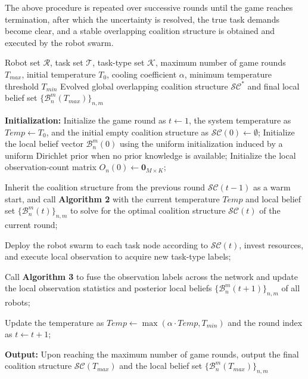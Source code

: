 \documentclass[journal,twoside,web]{ieeecolor}
\begin{document}
The above procedure is repeated over successive rounds until the game reaches termination, after which the uncertainty is resolved, the true task demands become clear, and a stable overlapping coalition structure is obtained and executed by the robot swarm.
\begin{algorithm}[!t]
\caption{BHTA dynamic game framework with cooperative observation and belief updating}
\label{alg:main_framework}
\begin{algorithmic}[1]
\REQUIRE Robot set $\mathcal{R}$, task set $\mathcal{T}$, task-type set $\mathcal{K}$, maximum number of game rounds $T_{max}$, initial temperature $T_0$, cooling coefficient $\alpha$, minimum temperature threshold $T_{min}$
\ENSURE Evolved global overlapping coalition structure $\mathcal{SC}^*$ and final local belief set $\{\mathcal{B}_n^m(T_{max})\}_{n,m}$

\STATE \textbf{Initialization:}
\STATE Initialize the game round as $t \leftarrow 1$, the system temperature as $Temp \leftarrow T_0$, and the initial empty coalition structure as $\mathcal{SC}(0) \leftarrow \emptyset$;
    \STATE Initialize the local belief vector $\mathcal{B}_n^m(0)$ using the uniform initialization induced by a uniform Dirichlet prior when no prior knowledge is available;
    \STATE Initialize the local observation-count matrix $O_n(0) \leftarrow \mathbf{0}_{M \times K}$;
\ENDFOR

    \STATE {}
    \STATE Inherit the coalition structure from the previous round $\mathcal{SC}(t-1)$ as a warm start, and call \textbf{Algorithm 2} with the current temperature $Temp$ and local belief set $\{\mathcal{B}_n^m(t)\}_{n,m}$ to solve for the optimal coalition structure $\mathcal{SC}(t)$ of the current round;

    \STATE {}
    \STATE Deploy the robot swarm to each task node according to $\mathcal{SC}(t)$, invest resources, and execute local observation to acquire new task-type labels;

    \STATE {}
    \STATE Call \textbf{Algorithm 3} to fuse the observation labels across the network and update the local observation statistics and posterior local beliefs $\{\mathcal{B}_n^m(t+1)\}_{n,m}$ of all robots;

    \STATE Update the temperature as $Temp \leftarrow \max(\alpha \cdot Temp, T_{min})$ and the round index as $t \leftarrow t + 1$;
\ENDWHILE

\STATE \textbf{Output:} Upon reaching the maximum number of game rounds, output the final coalition structure $\mathcal{SC}(T_{max})$ and the local belief set $\{\mathcal{B}_n^m(T_{max})\}_{n,m}$
\end{algorithmic}
\end{algorithm}
\end{document}
